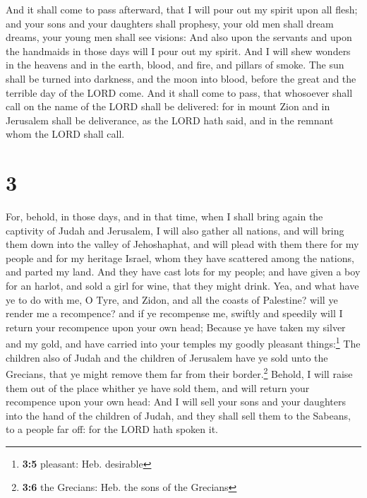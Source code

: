  And it shall come to pass afterward, that I will pour
out my spirit upon all flesh; and your sons and your daughters shall
prophesy, your old men shall dream dreams, your young men shall see
visions:  And also upon the servants and upon the
handmaids in those days will I pour out my spirit.  And I
will shew wonders in the heavens and in the earth, blood, and fire, and
pillars of smoke.  The sun shall be turned into darkness,
and the moon into blood, before the great and the terrible day of the
LORD come.  And it shall come to pass, that whosoever
shall call on the name of the LORD shall be delivered: for in mount Zion
and in Jerusalem shall be deliverance, as the LORD hath said, and in the
remnant whom the LORD shall call.

\hypertarget{section-2}{%
\section{3}\label{section-2}}

 For, behold, in those days, and in that time, when I
shall bring again the captivity of Judah and Jerusalem,  I
will also gather all nations, and will bring them down into the valley
of Jehoshaphat, and will plead with them there for my people and for my
heritage Israel, whom they have scattered among the nations, and parted
my land.  And they have cast lots for my people; and have
given a boy for an harlot, and sold a girl for wine, that they might
drink.  Yea, and what have ye to do with me, O Tyre, and
Zidon, and all the coasts of Palestine? will ye render me a recompence?
and if ye recompense me, swiftly and speedily will I return your
recompence upon your own head;  Because ye have taken my
silver and my gold, and have carried into your temples my goodly
pleasant things:\footnote{\textbf{3:5} pleasant: Heb. desirable}
 The children also of Judah and the children of Jerusalem
have ye sold unto the Grecians, that ye might remove them far from their
border.\footnote{\textbf{3:6} the Grecians: Heb. the sons of the
  Grecians}  Behold, I will raise them out of the place
whither ye have sold them, and will return your recompence upon your own
head:  And I will sell your sons and your daughters into
the hand of the children of Judah, and they shall sell them to the
Sabeans, to a people far off: for the LORD hath spoken it.

